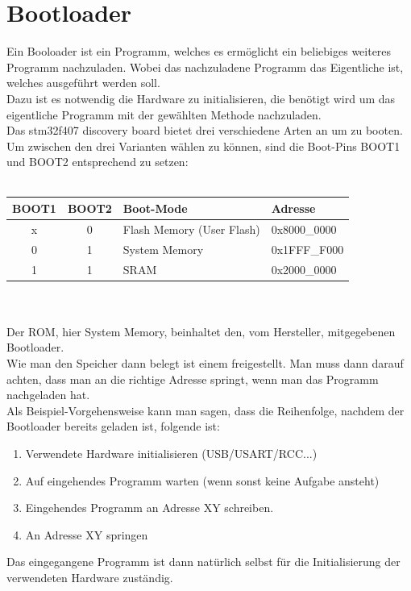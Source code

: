 \section{Bootloader}
Ein Booloader ist ein Programm, welches es erm\"oglicht ein beliebiges weiteres
 Programm nachzuladen. Wobei das nachzuladene Programm das Eigentliche ist, 
welches ausgef\"uhrt werden soll.\\
Dazu ist es notwendig die Hardware zu initialisieren, die ben\"otigt wird um das
 eigentliche Programm mit der gew\"ahlten Methode nachzuladen.\\
Das stm32f407 discovery board bietet drei verschiedene Arten an um zu booten.\\
Um zwischen den drei Varianten w\"ahlen zu k\"onnen, sind die Boot-Pins BOOT1
und BOOT2 entsprechend zu setzen:\\\\
\begin{tabular}{|c|c|l|l|}
\hline \hline
  BOOT1 & BOOT2 & Boot-Mode & Adresse\\ \hline
  x & 0 & Flash Memory (User Flash) & 0x8000\_0000\\
\hline
  0 & 1 & System Memory & 0x1FFF\_F000\\
\hline
 1  & 1 & SRAM & 0x2000\_0000\\
\hline
\end{tabular}\\\\
Der ROM, hier System Memory, beinhaltet den, vom Hersteller, mitgegebenen
 Bootloader.\\
Wie man den Speicher dann belegt ist einem freigestellt. Man muss dann darauf
achten, dass man an die richtige Adresse springt, wenn man das Programm nachgeladen
hat.\\
Als Beispiel-Vorgehensweise kann man sagen, dass die Reihenfolge, nachdem der
Bootloader bereits geladen ist, folgende ist:\\

\begin{enumerate}
\item Verwendete Hardware initialisieren (USB/USART/RCC...)
\item Auf eingehendes Programm warten (wenn sonst keine Aufgabe ansteht)
\item Eingehendes Programm an Adresse XY schreiben.
\item An Adresse XY springen
\end{enumerate}

Das eingegangene Programm ist dann nat\"urlich selbst f\"ur die Initialisierung
der verwendeten Hardware zust\"andig.\\

